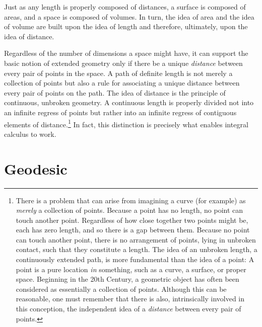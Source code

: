 \documentclass[nobib]{tufte-book}
\begin{document}
Just as any length is properly composed of distances, a surface is composed of
areas, and a space is composed of volumes.  In turn, the idea of area and the
idea of volume are built upon the idea of length and therefore, ultimately,
upon the idea of distance.

Regardless of the number of dimensions a space might have, it can support the
basic notion of extended geometry only if there be a unique \emph{distance}
between every pair of points in the space.  A path of definite length is not
merely a collection of points but also a rule for associating a unique distance
between every pair of points on the path.  The idea of distance is the
principle of continuous, unbroken geometry.
A continuous length is properly divided not into an infinite regress of points
but rather into an infinite regress of contiguous elements of
distance.\footnote{%
   There is a problem that can arise from imagining a curve (for example) as
   \emph{merely} a collection of points.  Because a point has no length, no
   point can touch another point.  Regardless of how close together two points
   might be, each has zero length, and so there is a gap between them.  Because
   no point can touch another point, there is no arrangement of points, lying
   in unbroken contact, such that they constitute a length.  The idea of an
   unbroken length, a continuously extended path, is more fundamental than the
   idea of a point:  A point is a pure location \emph{in} something, such as a
   curve, a surface, or proper space.  Beginning in the 20th Century, a
   geometric object has often been considered as essentially a collection of
   points.  Although this can be reasonable, one must remember that there is
   also, intrinsically involved in this conception, the independent idea of a
   \emph{distance} between every pair of points.%
}
In fact, this distinction is precisely what enables integral calculus to work.

\section{Geodesic}

\appendix

\backmatter






\printindex
\end{document}

